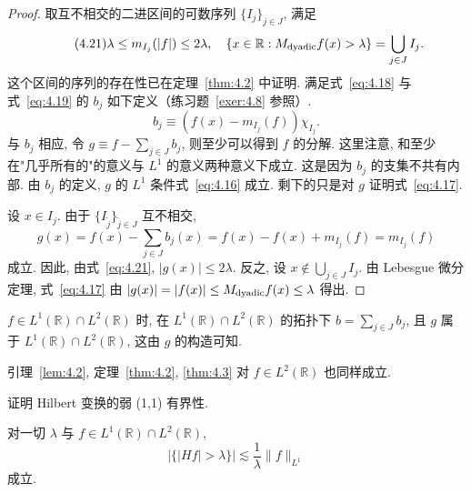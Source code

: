 \begin{proof}
取互不相交的二进区间的可数序列 $\{I_{j}\}_{j \in J}$, 满足
\begin{equation}\tag{4.21}
\lambda \leq m_{I_{j}}(|f|) \leq 2\lambda, \quad \{x \in \mathbb{R} : M_{\mathrm{dyadic}}f(x) > \lambda\} = \bigcup_{j \in J}I_{j}.
\label{eq:4.21}
\end{equation}
这个区间的序列的存在性已在定理~\ref{thm:4.2} 中证明. 满足式~\eqref{eq:4.18} 与式~\eqref{eq:4.19} 的 $b_{j}$ 如下定义（练习题~\ref{exer:4.8} 参照）.
\begin{equation}\tag{4.22}
b_{j} \equiv \left(f(x) - m_{I_{j}}(f)\right)\chi_{I_{j}}.
\label{eq:4.22}
\end{equation}
与 $b_{j}$ 相应, 令 $g \equiv f - \sum_{j \in J}b_{j}$, 则至少可以得到 $f$ 的分解. 这里注意, 和至少在"几乎所有的"的意义与 $L^{1}$ 的意义两种意义下成立. 这是因为 $b_{j}$ 的支集不共有内部. 由 $b_{j}$ 的定义, $g$ 的 $L^{1}$ 条件式~\eqref{eq:4.16} 成立. 剩下的只是对 $g$ 证明式~\eqref{eq:4.17}.

设 $x \in I_{j}$. 由于 $\{I_{\tilde{j}}\}_{\tilde{j} \in J}$ 互不相交,
\[
g(x) = f(x) - \sum_{j \in J}b_{j}(x) = f(x) - f(x) + m_{I_{j}}(f) = m_{I_{j}}(f)
\]
成立. 因此, 由式~\eqref{eq:4.21}, $|g(x)| \leq 2\lambda$. 反之, 设 $x \notin \bigcup_{j \in J}I_{j}$. 由 Lebesgue 微分定理, 式~\eqref{eq:4.17} 由 $|g(x)| = |f(x)| \leq M_{\mathrm{dyadic}}f(x) \leq \lambda$ 得出.
\end{proof}

\begin{note}\label{note:4.1}
$f \in L^{1}(\mathbb{R}) \cap L^{2}(\mathbb{R})$ 时, 在 $L^{1}(\mathbb{R}) \cap L^{2}(\mathbb{R})$ 的拓扑下 $b = \sum_{j \in J}b_{j}$, 且 $g$ 属于 $L^{1}(\mathbb{R}) \cap L^{2}(\mathbb{R})$, 这由 $g$ 的构造可知.
\end{note}

\begin{note}\label{note:4.2}
引理~\ref{lem:4.2}, 定理~\ref{thm:4.2}, \ref{thm:4.3} 对 $f \in L^{2}(\mathbb{R})$ 也同样成立.
\end{note}

证明 Hilbert 变换的弱 (1,1) 有界性.

\begin{theorem}\label{thm:4.4}
对一切 $\lambda$ 与 $f \in L^{1}(\mathbb{R}) \cap L^{2}(\mathbb{R})$,
\begin{equation}\tag{4.23}
|\{|Hf| > \lambda\}| \lesssim \frac{1}{\lambda}\|f\|_{L^{1}}
\label{eq:4.23}
\end{equation}
成立.
\end{theorem}

